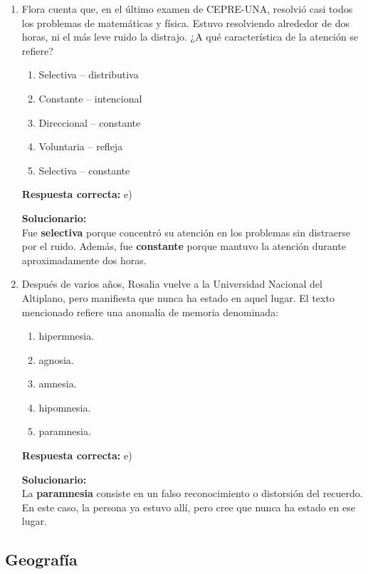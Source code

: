 \begin{enumerate}
	\item Flora cuenta que, en el último examen de CEPRE-UNA, resolvió casi todos los problemas de matemáticas y física. Estuvo resolviendo alrededor de dos horas, ni el más leve ruido la distrajo. ¿A qué característica de la atención se refiere?
	\begin{enumerate}[label=\alph*)]
		\item Selectiva -- distributiva
		\item Constante -- intencional
		\item Direccional -- constante
		\item Voluntaria -- refleja
		\item Selectiva -- constante
	\end{enumerate}
	\textbf{Respuesta correcta:} e)
	
	\vspace{2mm}
	\textbf{Solucionario:}\\
	Fue \textbf{selectiva} porque concentró su atención en los problemas sin distraerse por el ruido.  
	Además, fue \textbf{constante} porque mantuvo la atención durante aproximadamente dos horas.
	
	\vspace{6mm}
	
	\item Después de varios años, Rosalia vuelve a la Universidad Nacional del Altiplano, pero manifiesta que nunca ha estado en aquel lugar. El texto mencionado refiere una anomalía de memoria denominada:
	\begin{enumerate}[label=\alph*)]
		\item hipermnesia.
		\item agnosia.
		\item amnesia.
		\item hipomnesia.
		\item paramnesia.
	\end{enumerate}
	\textbf{Respuesta correcta:} e)
	
	\vspace{2mm}
	\textbf{Solucionario:}\\
	La \textbf{paramnesia} consiste en un falso reconocimiento o distorsión del recuerdo.  
	En este caso, la persona ya estuvo allí, pero cree que nunca ha estado en ese lugar.
	
	\vspace{6mm}
	
\end{enumerate}

\subsection*{Geografía}

